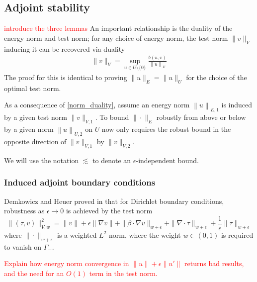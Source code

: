 \documentclass[11pt,onecolumn]{scrartcl}
\newcommand{\grad}{\nabla}
\renewcommand{\div}{\grad \cdot}
\begin{document}
\subsection{Adjoint stability}

\textcolor{red}{introduce the three lemmas}
An important relationship is the duality of the energy norm and test norm; for any choice of energy norm, the test norm $\|v\|_V$ inducing it can be recovered via duality
\begin{align}
\| v \|_V = \sup_{u \in U\setminus \{0\}} \frac{b\left(u,v\right)}{\left\| u \right\|_E} \label{norm_duality}
\end{align}
The proof for this is identical to proving $\|u\|_E = \|u\|_U$ for the choice of the optimal test norm.  

As a consequence of \eqref{norm_duality}, assume an energy norm $\left\| u \right\|_{E,1}$ is induced by a given test norm $\| v  \|_{V,1}$.  To bound $\|\cdot\|_E$ robustly from above or below by a given norm $\left\| u \right\|_{U,2}$ on $U$ now only requires the robust bound in the opposite direction of $\| v \|_{V,1}$ by $\|v\|_{V,2}$. 

We will use the notation $\lesssim$ to denote an $\epsilon$-independent bound. 

\subsubsection{Induced adjoint boundary conditions}

Demkowicz and Heuer proved in \cite{DPGrobustness} that for Dirichlet boundary conditions, robustness as $\epsilon \rightarrow 0$ is achieved by the test norm
\[
\|\left(\tau, v\right)\|_{V,w}^2 = \|v\| + \epsilon \|\grad v\| + \|\beta \cdot \grad v\|_{w+\epsilon} + \| \div \tau\|_{w+\epsilon} + \frac{1}{\epsilon}\|\tau\|_{w+\epsilon}
\]
where $\|\cdot \|_{w+\epsilon}$ is a weighted $L^2$ norm, where the weight $w \in (0,1)$ is required to vanish on $\Gamma_-$.  

\textcolor{red}{Explain how energy norm convergence in $\|u\| + \epsilon \|u'\|$ returns bad results, and the need for an $O(1)$ term in the test norm.}	
\end{document}
